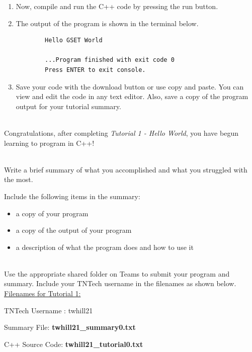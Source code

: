 \documentclass[12pt]{article}
\begin{document}
\begin{description}[labelindent=1cm]
\begin{enumerate}
		\item Now, compile and run the C++ code by pressing the run button.
		
		\item	
		The output of the program is shown in the terminal below.
		\begin{verbatim} 
		Hello GSET World
		
		...Program finished with exit code 0
		Press ENTER to exit console.
		\end{verbatim}
	
		\item Save your code with the download button or use copy and paste. You can view and edit the code in any text editor. Also, save a copy of the program output for your tutorial summary. 

	\end{enumerate}

\item[\textbf{\underline{Tutorial Complete:}}] \hfill \vspace{3mm}\\ 
	Congratulations, after completing {\it Tutorial 1 - Hello World}, you have begun learning to program in C++! \\


\newpage
\item[\textbf{\underline{Tutorial Summary:}}] \hfill \vspace{3mm}\\ 
Write a brief summary of what you accomplished and what you struggled with the most. 

Include the following items in the summary:
\begin{itemize}

\item a copy of your program
\item a copy of the output of your program
\item a description of what the program does and how to use it

\end{itemize}


\item[\textbf{\underline{Submission on Teams:}}] \hfill \vspace{3mm}\\ 
Use the appropriate shared folder on Teams to submit your program and summary. Include your TNTech username in the filenames as shown below. \vspace{3mm}\\

\underline{Filenames for Tutorial 1:}

TNTech Username : twhill21

Summary File: \textbf{ twhill21\_summary0.txt}

C++ Source Code: \textbf{ twhill21\_tutorial0.txt}





\end{description}
\end{document}
